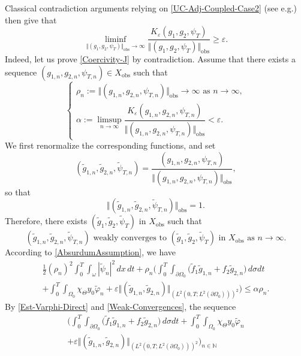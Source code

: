 \documentclass[10pt,a4paper]{amsart}
\providecommand{\eg}{e.g.}
\newcommand{\obs}{\mathrm{obs}}
\newcommand\N{{\mathbb N}}
\newcommand{\norm}[1]{\Vert#1\Vert}
\theoremstyle{definition}
\begin{document}
Classical contradiction arguments relying on \eqref{UC-Adj-Coupled-Case2} (see \eg \cite{Ervedoza-Note-2020}) then give that
\begin{equation}
\label{Coercivity-J}
\liminf_{\norm{(g_1, g_2, \psi_T)}_{\obs} \to \infty} \frac{K_\varepsilon(g_1, g_2, \psi_T) }{\norm{(g_1, g_2, \psi_T)}_{\obs}} \geq \varepsilon.
\end{equation}
Indeed, let us prove \eqref{Coercivity-J} by contradiction. Assume that there exists a sequence $(g_{1,n}, g_{2,n}, \psi_{T,n}) \in X_{\obs}$ such that
\begin{equation}
\label{AbsurdumAssumption}
\begin{cases}
\rho_n := \norm{(g_{1,n}, g_{2,n}, \psi_{T,n})}_{\obs} \to \infty \text{ as } n \to \infty,\\[3pt]
\alpha:=\limsup_{n \to \infty} \dfrac{K_\varepsilon(g_{1,n}, g_{2,n}, \psi_{T,n})}{\norm{(g_{1,n}, g_{2,n}, \psi_{T,n})}_{\obs}} < \varepsilon.
\end{cases}
\end{equation}
We first renormalize the corresponding functions, and set
\[
(\tilde g_{1,n}, \tilde g_{2,n}, \tilde \psi_{T,n}) = \frac{(g_{1,n}, g_{2,n}, \psi_{T,n})}{ \norm{(g_{1,n}, g_{2,n}, \psi_{T,n})}_{\obs}},
\]
so that
\begin{equation}
\label{Bound-tilde-n}
\norm{(\tilde g_{1,n}, \tilde g_{2,n}, \tilde \psi_{T,n}) }_{\obs} = 1.
\end{equation}
Therefore, there exists $(\tilde g_1, \tilde g_2, \tilde \psi_T)$ in $X_{\obs}$ such that
\begin{equation}
\label{Weak-Convergences}
(\tilde g_{1,n}, \tilde g_{2,n}, \tilde \psi_{T,n}) \text{ weakly converges to }(\tilde g_1, \tilde g_2, \tilde \psi_T) \text{ in } X_{\obs} \text{ as } n \to \infty.
\end{equation}
According to \eqref{AbsurdumAssumption}, we have
\begin{multline}
\label{J-eps-expanded}
\frac{1}{2}(\rho_n)^2 \int_0^T \int_\omega |\tilde \psi_n|^2 \, dx\,dt
+
\rho_n
\biggl(
\int_0^T \int_{\partial \Omega_0} \bigl(\tilde f_1 \tilde g_{1,n} + f_2 \tilde g_{2,n} \bigr) \, d\sigma dt\\
+
\int_0^T \int_{\Omega_0} \chi_{\Theta} y_0 \tilde \varphi_n
+
\varepsilon { \norm{(\tilde g_{1,n}, \tilde g_{2,n})}_{(L^2(0,T; L^2(\partial\Omega_0)))^2}
}
\biggr)
\leq \alpha \rho_n.
\end{multline}
By \eqref{Est-Varphi-Direct} and \eqref{Weak-Convergences}, the sequence
\begin{multline*}
\biggl(
\int_0^T \int_{\partial \Omega_0} \bigl(\tilde f_1 \tilde g_{1,n} + f_2 \tilde g_{2,n} \bigr) \, d\sigma dt
+
\int_0^T \int_{\Omega_0} \chi_{\Theta} y_0 \tilde \varphi_n\\[-10pt]
+
\varepsilon
{ \norm{(\tilde g_{1,n}, \tilde g_{2,n})}_{(L^2(0,T; L^2(\partial\Omega_0)))^2}}
\biggr)_{n \in \N}
\end{multline*}
\end{document}

